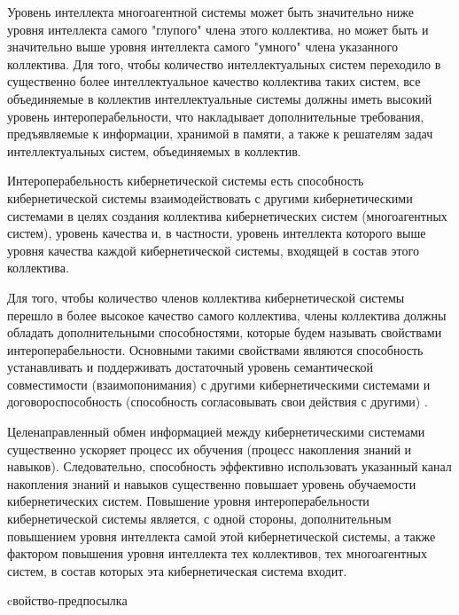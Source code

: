 Уровень интеллекта многоагентной системы может быть значительно ниже уровня интеллекта самого "глупого"{} члена этого коллектива, но может быть и значительно выше уровня интеллекта самого "умного"{} члена указанного коллектива.
Для того, чтобы количество интеллектуальных систем переходило в существенно более интеллектуальное качество коллектива таких систем, все объединяемые в коллектив интеллектуальные системы должны иметь высокий уровень интероперабельности, что накладывает дополнительные требования, предъявляемые к информации, хранимой в памяти, а также к решателям задач интеллектуальных систем, объединяемых в коллектив.

Интероперабельность кибернетической системы есть способность кибернетической системы взаимодействовать с другими кибернетическими системами в целях создания коллектива кибернетических систем (многоагентных систем), уровень качества и, в частности, уровень интеллекта которого выше уровня качества каждой кибернетической системы, входящей в состав этого коллектива.

Для того, чтобы количество членов коллектива кибернетической системы перешло в более высокое качество самого коллектива, члены коллектива должны обладать дополнительными способностями, которые будем называть свойствами интероперабельности.
Основными такими свойствами являются способность устанавливать и поддерживать достаточный уровень семантической совместимости (взаимопонимания) с другими кибернетическими системами и договороспособность (способность согласовывать свои действия с другими) .

Целенаправленный обмен информацией между кибернетическими системами существенно ускоряет процесс их обучения (процесс накопления знаний и навыков).
Следовательно, способность эффективно использовать указанный канал накопления знаний и навыков существенно повышает уровень обучаемости кибернетических систем.
Повышение уровня интероперабельности кибернетической системы является, с одной стороны, дополнительным повышением уровня интеллекта самой этой кибернетической системы, а также фактором повышения уровня интеллекта тех коллективов, тех многоагентных систем, в состав которых эта кибернетическая система входит.

\begin{SCn}
\begin{scnrelfromlist}{cвойство-предпосылка}
\end{scnrelfromlist}
\end{SCn}

